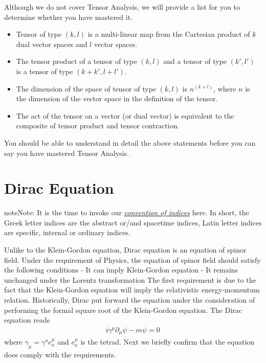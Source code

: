 \documentclass[letterpaper,10pt,english]{sphinxmanual}
\begin{document}
Although we do not cover Tensor Analysis, we will provide a list for you to determine whether you have mastered it.
\begin{itemize}
\item {} 
Tensor of type \((k, l)\) is a multi-linear map from the Cartesian product of \(k\) dual vector spaces and \(l\) vector spaces.

\item {} 
The tensor product of a tensor of type \((k, l)\) and a tensor of type \((k', l')\) is a tensor of type \((k+k', l+l')\).

\item {} 
The dimension of the space of tensor of type \((k, l)\) is \(n^{(k+l)}\), where \(n\) is the dimension of the vector space in the definition of the tensor.

\item {} 
The act of the tensor on a vector (or dual vector) is equivalent to the composite of tensor product and tensor contraction.

\end{itemize}

You should be able to understand in detail the above statements before you can say you have mastered Tensor Analysis.


\section{Dirac Equation}
\label{\detokenize{dirac::doc}}\label{\detokenize{dirac:dirac-equation}}
\begin{sphinxadmonition}{note}{Note:}
It is the time to invoke our {\hyperref[\detokenize{dirac:}]{\emph{convention of indices}}} here. In short, the Greek letter indices are the abstract or/and spacetime indices, Latin letter indices are specific, internal or ordinary indices.
\end{sphinxadmonition}

Unlike to the Klein-Gordon equation, Dirac equation is an equation of spinor field. Under the requirement of Physics, the equation of spinor field should satisfy the following conditions
- It can imply Klein-Gordon equation
- It remains unchanged under the Lorentz transformation
The first requirement is due to the fact that the Klein-Gordon equation will imply the relativistic energy-momentum relation. Historically, Dirac put forward the equation under the consideration of performing the formal square root of the Klein-Gordon equation. The Dirac equation reads
\begin{equation*}
\begin{split}\mathrm{i}\gamma^\mu\!\partial_\mu\psi - m\psi = 0\end{split}
\end{equation*}
where \(\gamma_\mu = \gamma^a e_a^\mu\) and \(e_a^\mu\) is the tetrad. Next we briefly confirm that the equation does comply with the requirements.
\end{document}
